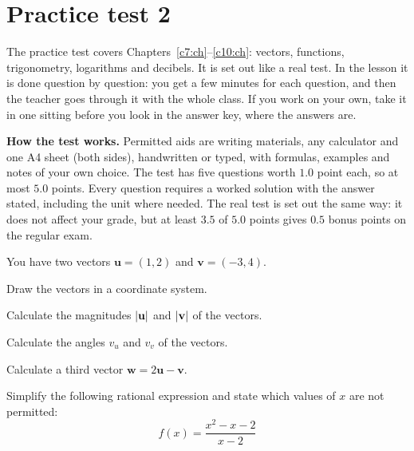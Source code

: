 
\section{Practice test 2}
\label{c11:sec:ovningsdugga}
The practice test covers Chapters~\ref{c7:ch}--\ref{c10:ch}: vectors, functions, trigonometry,
logarithms and decibels. It is set out like a real test. In the lesson it is done question by
question: you get a few minutes for each question, and then the teacher goes through it with the
whole class. If you work on your own, take it in one sitting before you look in the answer key,
where the answers are.

\begin{aside}
\textbf{How the test works.} Permitted aids are writing materials, any calculator and one A4 sheet
(both sides), handwritten or typed, with formulas, examples and notes of your own choice. The test has five questions worth $1.0$ point each, so at
most $5.0$ points. Every question requires a worked solution with the answer stated, including the
unit where needed. The real test is set out the same way: it does not affect your grade, but at
least $3.5$ of $5.0$ points gives $0.5$ bonus points on the regular exam.
\end{aside}


You have two vectors $\mathbf{u} = (1, 2)$ and $\mathbf{v} = (-3, 4)$.
\begin{parts}
  \item Draw the vectors in a coordinate system.
  \item Calculate the magnitudes $\lvert\mathbf{u}\rvert$ and $\lvert\mathbf{v}\rvert$ of the vectors.
  \item Calculate the angles $v_u$ and $v_v$ of the vectors.
  \item Calculate a third vector $\mathbf{w} = 2\mathbf{u} - \mathbf{v}$.
\end{parts}

Simplify the following rational expression and state which values of $x$ are not permitted:
\[
  f(x) = \frac{x^2 - x - 2}{x - 2}
\]

